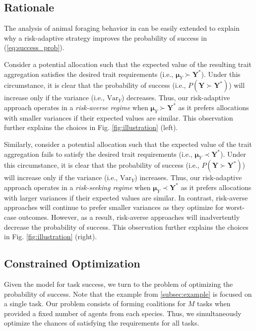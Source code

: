 \documentclass[letterpaper, 10 pt, conference]{ieeeconf}  %
\begin{document}
\subsection{Rationale}
\label{sec:rationale}

The analysis of animal foraging behavior in \cite{stephens_logic_1981} can be easily extended to explain why a risk-adaptive strategy improves the probability of success in (\ref{eq:success_prob}).

Consider a potential allocation such that the expected value of the resulting trait aggregation satisfies the desired trait requirements (i.e., $\bm{\mu}_Y \succ \bm{Y}^*$). Under this circumstance, it is clear that the probability of success (i.e., $P(\bm{Y} \succ \bm{Y}^*)$) will increase only if the variance (i.e., $\bm{\mathrm{Var}}_{Y}$) decreases. Thus, our risk-adaptive approach operates in a \textit{risk-averse regime} when $\bm{\mu}_Y \succ \bm{Y}^*$ as it prefers allocations with smaller variances if their expected values are similar. This observation further explains the choices in Fig. \ref{fig:illustration} (left).

Similarly, consider a potential allocation such that the expected value of the trait aggregation fails to satisfy the desired trait requirements (i.e., $\bm{\mu}_Y \prec \bm{Y}^*$). Under this circumstance, it is clear that the probability of success (i.e., $P(\bm{Y} \succ \bm{Y}^*)$) will increase only if the variance (i.e., $\bm{\mathrm{Var}}_{Y}$) increases. Thus, our risk-adaptive approach operates in a \textit{risk-seeking regime} when $\bm{\mu}_Y \prec \bm{Y}^*$ as it prefers allocations with larger variances if their expected values are similar. In contrast, risk-averse approaches will continue to prefer smaller variances as they optimize for worst-case outcomes. However, as a result, risk-averse approaches will inadvertently decrease the probability of success. This observation further explains the choices in Fig. \ref{fig:illustration} (right).

\subsection{Constrained Optimization}
\label{subsec:optimization}

Given the model for task success, we turn to the problem of optimizing the probability of success. Note that the example from \ref{subsec:example} is focused on a single task. Our problem consists of forming coalitions for $M$ tasks when provided a fixed number of agents from each species. Thus, we simultaneously optimize the chances of satisfying the requirements for all tasks.
\end{document}
